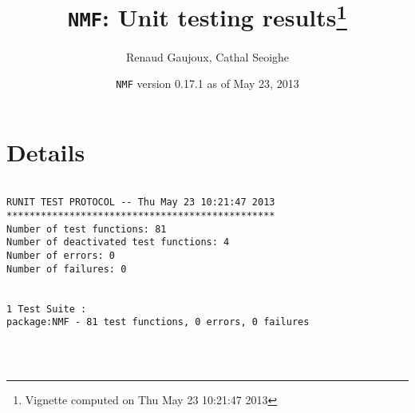 \documentclass[10pt]{article}
\author{Renaud Gaujoux, Cathal Seoighe}
\title{\texttt{NMF}: Unit testing results\footnote{Vignette computed  on Thu May 23 10:21:47 2013}}
\date{\texttt{NMF} version 0.17.1 as of May 23, 2013}
\begin{document}
\maketitle

\section{Details}
\begin{verbatim}

RUNIT TEST PROTOCOL -- Thu May 23 10:21:47 2013 
*********************************************** 
Number of test functions: 81 
Number of deactivated test functions: 4 
Number of errors: 0 
Number of failures: 0 

 
1 Test Suite : 
package:NMF - 81 test functions, 0 errors, 0 failures




\end{verbatim}
\end{document}
